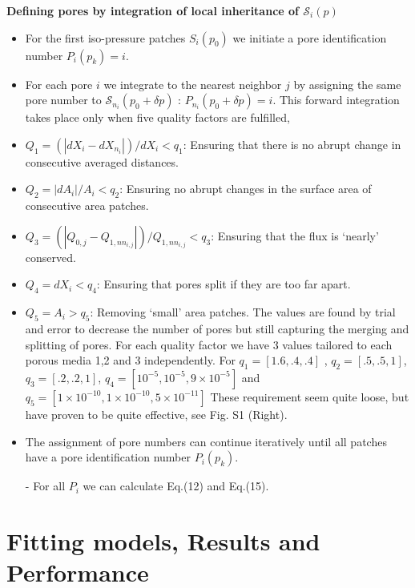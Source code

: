 \documentclass[draft,jgrga]{agutexSI2019}
\begin{document}
\begin{article}
\noindent\textbf{Defining pores by integration of local inheritance of $\mathcal{S}_i(p)$}
\begin{itemize}
	\item For the first iso-pressure patches $S_i(p_0)$ we initiate a pore identification number $P_i(p_k) = i$. 
	\item For each pore $i$ we integrate to the nearest neighbor $j$ by assigning the same pore number to $\mathcal{S}_{n_i}(p_0+\delta p)$ : $P_{n_i}(p_0+\delta p) = i$. This forward integration takes place only when five quality factors are fulfilled,
	\item $Q_1 = (|dX_i-dX_{n_i}|)/dX_i<q_1$: Ensuring that there is no abrupt change in consecutive averaged distances. 
	\item $Q_2 = |dA_i|/A_i<q_2$: Ensuring no abrupt changes in the surface area of consecutive area patches. 
	\item $Q_3 = (|Q_{0,j}-Q_{1,nn_{i,j}}|)/Q_{1,nn_{i,j}}<q_3$: Ensuring that the flux is `nearly' conserved.  
	\item $Q_4 = dX_i < q_4$: Ensuring that pores split if they are too far apart. 
	\item $Q_5 = A_i > q_5$: Removing `small' area patches. 
	The values are found by trial and error to decrease the number of pores but still capturing the merging and splitting of pores. For each quality factor we have 3 values tailored to each porous media 1,2 and 3 independently. For $q_1 = [1.6,.4,.4]$
, $q_2 = [.5,.5,1]$, $q_3 = [.2,.2,1]$, $q_4 = [10^{-5},10^{-5},9\times10^{-5}]$ and $q_5 = [1\times10^{-10},1\times10^{-10},5\times10^{-11}]$	These requirement seem quite loose, but have proven to be quite effective, see Fig. S1 (Right).
	\item The assignment of pore numbers can continue iteratively until all patches have a pore identification number $P_i(p_k)$.	
	\item[-]For all $P_i$ we can calculate Eq.(12) and Eq.(15).
\end{itemize}



\section{Fitting models, Results and Performance}

\end{article}
\end{document}
